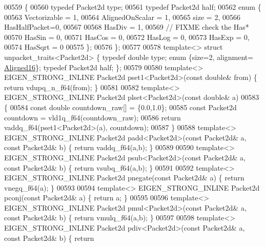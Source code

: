 \begin{DoxyCode}
{{00559 \{
00560   \textcolor{keyword}{typedef} Packet2d type;
00561   \textcolor{keyword}{typedef} Packet2d half;
00562   \textcolor{keyword}{enum} \{
00563     Vectorizable = 1,
00564     AlignedOnScalar = 1,
00565     size = 2,
00566     HasHalfPacket=0,
00567    
00568     HasDiv  = 1,
00569     \textcolor{comment}{// FIXME check the Has*}
00570     HasSin  = 0,
00571     HasCos  = 0,
00572     HasLog  = 0,
00573     HasExp  = 0,
00574     HasSqrt = 0
00575   \};
00576 \};
00577 
00578 \textcolor{keyword}{template}<> \textcolor{keyword}{struct }unpacket\_traits<Packet2d> \{ \textcolor{keyword}{typedef} \textcolor{keywordtype}{double}  type; \textcolor{keyword}{enum} \{size=2, alignment=
      \hyperlink{group__enums_gga45fe06e29902b7a2773de05ba27b47a1af8e2bf74b04c02199f62c5e3c06dbfcc}{Aligned16}\}; \textcolor{keyword}{typedef} Packet2d half; \};
00579 
00580 \textcolor{keyword}{template}<> EIGEN\_STRONG\_INLINE Packet2d pset1<Packet2d>(\textcolor{keyword}{const} \textcolor{keywordtype}{double}&  from) \{ \textcolor{keywordflow}{return} vdupq\_n\_f64(from); \}
00581 
00582 \textcolor{keyword}{template}<> EIGEN\_STRONG\_INLINE Packet2d plset<Packet2d>(\textcolor{keyword}{const} \textcolor{keywordtype}{double}& a)
00583 \{
00584   \textcolor{keyword}{const} \textcolor{keywordtype}{double} countdown\_raw[] = \{0.0,1.0\};
00585   \textcolor{keyword}{const} Packet2d countdown = vld1q\_f64(countdown\_raw);
00586   \textcolor{keywordflow}{return} vaddq\_f64(pset1<Packet2d>(a), countdown);
00587 \}
00588 \textcolor{keyword}{template}<> EIGEN\_STRONG\_INLINE Packet2d padd<Packet2d>(\textcolor{keyword}{const} Packet2d& a, \textcolor{keyword}{const} Packet2d& b) \{ \textcolor{keywordflow}{return} 
      vaddq\_f64(a,b); \}
00589 
00590 \textcolor{keyword}{template}<> EIGEN\_STRONG\_INLINE Packet2d psub<Packet2d>(\textcolor{keyword}{const} Packet2d& a, \textcolor{keyword}{const} Packet2d& b) \{ \textcolor{keywordflow}{return} 
      vsubq\_f64(a,b); \}
00591 
00592 \textcolor{keyword}{template}<> EIGEN\_STRONG\_INLINE Packet2d pnegate(\textcolor{keyword}{const} Packet2d& a) \{ \textcolor{keywordflow}{return} vnegq\_f64(a); \}
00593 
00594 \textcolor{keyword}{template}<> EIGEN\_STRONG\_INLINE Packet2d pconj(\textcolor{keyword}{const} Packet2d& a) \{ \textcolor{keywordflow}{return} a; \}
00595 
00596 \textcolor{keyword}{template}<> EIGEN\_STRONG\_INLINE Packet2d pmul<Packet2d>(\textcolor{keyword}{const} Packet2d& a, \textcolor{keyword}{const} Packet2d& b) \{ \textcolor{keywordflow}{return} 
      vmulq\_f64(a,b); \}
00597 
00598 \textcolor{keyword}{template}<> EIGEN\_STRONG\_INLINE Packet2d pdiv<Packet2d>(\textcolor{keyword}{const} Packet2d& a, \textcolor{keyword}{const} Packet2d& b) \{ \textcolor{keywordflow}{return} 
}}
\end{DoxyCode}
